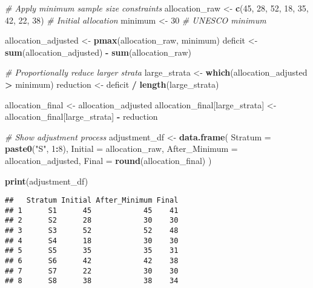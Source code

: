 \documentclass[
]{article}
\newenvironment{Shaded}{\begin{snugshade}}{\end{snugshade}}
\newcommand{\AttributeTok}[1]{\textcolor[rgb]{0.13,0.29,0.53}{#1}}
\newcommand{\CommentTok}[1]{\textcolor[rgb]{0.56,0.35,0.01}{\textit{#1}}}
\newcommand{\DecValTok}[1]{\textcolor[rgb]{0.00,0.00,0.81}{#1}}
\newcommand{\FunctionTok}[1]{\textcolor[rgb]{0.13,0.29,0.53}{\textbf{#1}}}
\newcommand{\NormalTok}[1]{#1}
\newcommand{\OtherTok}[1]{\textcolor[rgb]{0.56,0.35,0.01}{#1}}
\newcommand{\SpecialCharTok}[1]{\textcolor[rgb]{0.81,0.36,0.00}{\textbf{#1}}}
\newcommand{\StringTok}[1]{\textcolor[rgb]{0.31,0.60,0.02}{#1}}
\begin{document}
\begin{Shaded}
\begin{Highlighting}[]
\CommentTok{\# Apply minimum sample size constraints}
\NormalTok{allocation\_raw }\OtherTok{\textless{}{-}} \FunctionTok{c}\NormalTok{(}\DecValTok{45}\NormalTok{, }\DecValTok{28}\NormalTok{, }\DecValTok{52}\NormalTok{, }\DecValTok{18}\NormalTok{, }\DecValTok{35}\NormalTok{, }\DecValTok{42}\NormalTok{, }\DecValTok{22}\NormalTok{, }\DecValTok{38}\NormalTok{)  }\CommentTok{\# Initial allocation}
\NormalTok{minimum }\OtherTok{\textless{}{-}} \DecValTok{30}  \CommentTok{\# UNESCO minimum}

\NormalTok{allocation\_adjusted }\OtherTok{\textless{}{-}} \FunctionTok{pmax}\NormalTok{(allocation\_raw, minimum)}
\NormalTok{deficit }\OtherTok{\textless{}{-}} \FunctionTok{sum}\NormalTok{(allocation\_adjusted) }\SpecialCharTok{{-}} \FunctionTok{sum}\NormalTok{(allocation\_raw)}

\CommentTok{\# Proportionally reduce larger strata}
\NormalTok{large\_strata }\OtherTok{\textless{}{-}} \FunctionTok{which}\NormalTok{(allocation\_adjusted }\SpecialCharTok{\textgreater{}}\NormalTok{ minimum)}
\NormalTok{reduction }\OtherTok{\textless{}{-}}\NormalTok{ deficit }\SpecialCharTok{/} \FunctionTok{length}\NormalTok{(large\_strata)}

\NormalTok{allocation\_final }\OtherTok{\textless{}{-}}\NormalTok{ allocation\_adjusted}
\NormalTok{allocation\_final[large\_strata] }\OtherTok{\textless{}{-}}\NormalTok{ allocation\_final[large\_strata] }\SpecialCharTok{{-}}\NormalTok{ reduction}

\CommentTok{\# Show adjustment process}
\NormalTok{adjustment\_df }\OtherTok{\textless{}{-}} \FunctionTok{data.frame}\NormalTok{(}
  \AttributeTok{Stratum =} \FunctionTok{paste0}\NormalTok{(}\StringTok{"S"}\NormalTok{, }\DecValTok{1}\SpecialCharTok{:}\DecValTok{8}\NormalTok{),}
  \AttributeTok{Initial =}\NormalTok{ allocation\_raw,}
  \AttributeTok{After\_Minimum =}\NormalTok{ allocation\_adjusted,}
  \AttributeTok{Final =} \FunctionTok{round}\NormalTok{(allocation\_final)}
\NormalTok{)}

\FunctionTok{print}\NormalTok{(adjustment\_df)}
\end{Highlighting}
\end{Shaded}

\begin{verbatim}
##   Stratum Initial After_Minimum Final
## 1      S1      45            45    41
## 2      S2      28            30    30
## 3      S3      52            52    48
## 4      S4      18            30    30
## 5      S5      35            35    31
## 6      S6      42            42    38
## 7      S7      22            30    30
## 8      S8      38            38    34
\end{verbatim}
\end{document}
